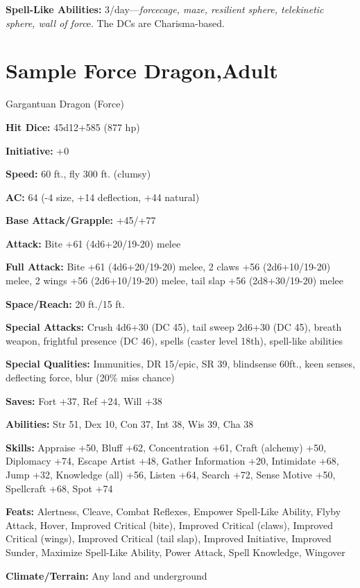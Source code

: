 \documentclass{article}
\begin{document}
\textbf{Spell-Like Abilities:} 3/day---\textit{forcecage, maze, resilient sphere, 
telekinetic sphere, wall of forc}e. The DCs are Charisma-based.

\vspace{12pt}
\section*{\textbf{Sample Force Dragon,Adult }}

Gargantuan Dragon (Force) 

\textbf{Hit Dice:} 45d12+585 (877 hp) 

\textbf{Initiative:} +0 

\textbf{Speed:} 60 ft., fly 300 ft. (clumsy) 

\textbf{AC:} 64 (-4 size, +14 deflection, +44 natural) 

\textbf{Base Attack/Grapple:} +45/+77

\textbf{Attack: } Bite +61 (4d6+20/19-20) melee

\textbf{Full Attack: }Bite +61 (4d6+20/19-20) melee, 2 claws +56 (2d6+10/19-20) 
melee, 2 wings +56 (2d6+10/19-20) melee, tail slap +56 (2d8+30/19-20) melee

\textbf{Space/Reach:} 20 ft./15 ft. 

\textbf{Special Attacks:} Crush 4d6+30 (DC 45), tail sweep 2d6+30 (DC 45), breath 
weapon, frightful presence (DC 46), spells (caster level 18th), spell-like abilities 

\textbf{Special Qualities:} Immunities, DR 15/epic, SR 39, blindsense 60ft., keen 
senses, deflecting force, blur (20\% miss chance) 

\textbf{Saves:} Fort +37, Ref +24, Will +38 

\textbf{Abilities:} Str 51, Dex 10, Con 37, Int 38, Wis 39, Cha 38 

\textbf{Skills:} Appraise +50, Bluff +62, Concentration +61, Craft (alchemy) +50, 
Diplomacy +74, Escape Artist +48, Gather Information +20, Intimidate +68, Jump 
+32, Knowledge (all) +56, Listen +64, Search +72, Sense Motive +50, Spellcraft 
+68, Spot +74

\textbf{Feats:} Alertness, Cleave, Combat Reflexes, Empower Spell-Like Ability, 
Flyby Attack, Hover, Improved Critical (bite), Improved Critical (claws), Improved 
Critical (wings), Improved Critical (tail slap), Improved Initiative, Improved 
Sunder, Maximize Spell-Like Ability, Power Attack, Spell Knowledge, Wingover 

\textbf{Climate/Terrain:} Any land and underground 
\end{document}
